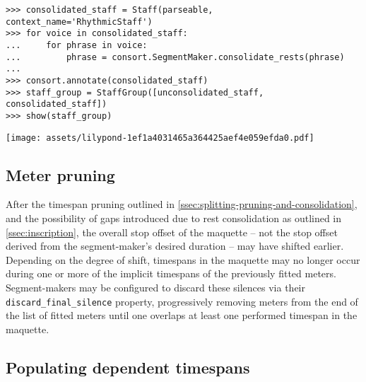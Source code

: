 \begin{comment}
<abjad>
consolidated_staff = Staff(parseable, context_name='RhythmicStaff')
for voice in consolidated_staff:
    for phrase in voice:
        phrase = consort.SegmentMaker.consolidate_rests(phrase)

consort.annotate(consolidated_staff)
staff_group = StaffGroup([unconsolidated_staff, consolidated_staff])
show(staff_group)
</abjad>
\end{comment}

\begin{abjadbookoutput}
\begin{singlespacing}
\vspace{-0.5\baselineskip}
\begin{lstlisting}
>>> consolidated_staff = Staff(parseable, context_name='RhythmicStaff')
>>> for voice in consolidated_staff:
...     for phrase in voice:
...         phrase = consort.SegmentMaker.consolidate_rests(phrase)
...
>>> consort.annotate(consolidated_staff)
>>> staff_group = StaffGroup([unconsolidated_staff, consolidated_staff])
>>> show(staff_group)
\end{lstlisting}
\noindent\texttt{[image: assets/lilypond-1ef1a4031465a364425aef4e059efda0.pdf]}
\end{singlespacing}
\end{abjadbookoutput}

\subsection{Meter pruning}
\label{ssec:meter-pruning}

After the timespan pruning outlined in
\autoref{ssec:splitting-pruning-and-consolidation}, and the possibility of gaps
introduced due to rest consolidation as outlined in \autoref{ssec:inscription},
the overall stop offset of the maquette -- not the stop offset derived from the
segment-maker's desired duration -- may have shifted earlier. Depending on the
degree of shift, timespans in the maquette may no longer occur during one or
more of the implicit timespans of the previously fitted meters. Segment-makers
may be configured to discard these silences via their
\texttt{discard\_final\_silence} property, progressively removing meters from
the end of the list of fitted meters until one overlaps at least one performed
timespan in the maquette.

\subsection{Populating dependent timespans}
\label{ssec:populating-dependent-timespans}

